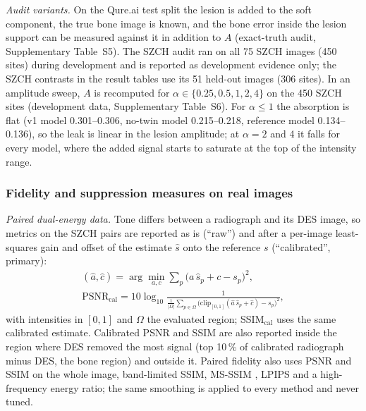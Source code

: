 \emph{Audit variants.} On the Qure.ai test split the lesion is added to the soft component, the true bone image is known, and the bone
error inside the lesion support can be measured against it in addition to $A$ (exact-truth audit, Supplementary Table~S5). The SZCH audit
ran on all 75 SZCH images (450 sites) during development and is reported as development evidence only; the SZCH contrasts in the result
tables use its 51 held-out images (306 sites). In an amplitude sweep, $A$ is recomputed for $\alpha\in\{0.25,0.5,1,2,4\}$ on the 450 SZCH
sites (development data, Supplementary Table~S6). For $\alpha\le1$ the absorption is flat (v1 model 0.301--0.306, no-twin model
0.215--0.218, reference model 0.134--0.136), so the leak is linear in the lesion amplitude; at $\alpha=2$ and 4 it falls for every model,
where the added signal starts to saturate at the top of the intensity range.

\subsubsection{Fidelity and suppression measures on real images}
\label{sec:m-fidelity}
\emph{Paired dual-energy data.} Tone differs between a radiograph and its DES image, so metrics on the SZCH pairs are reported as is
(``raw'') and after a per-image least-squares gain and offset of the estimate $\hat s$ onto the reference $s$ (``calibrated'', primary):
\begin{equation}
\begin{gathered}
(\hat a,\hat c)=\arg\min_{a,c}\sum_p\big(a\,\hat s_p+c-s_p\big)^2,\\
\mathrm{PSNR}_{\mathrm{cal}}=10\log_{10}\frac{1}{\frac{1}{|\Omega|}\sum_{p\in\Omega}\big(\mathrm{clip}_{[0,1]}(\hat a\,\hat s_p+\hat c)-s_p\big)^2},
\end{gathered}
\label{eq:psnrcal}
\end{equation}
with intensities in $[0,1]$ and $\Omega$ the evaluated region; SSIM$_{\mathrm{cal}}$ uses the same calibrated estimate. Calibrated PSNR and
SSIM are also reported inside the region where DES removed the most signal (top 10\,\% of calibrated radiograph minus DES, the bone region)
and outside it. Paired fidelity also uses PSNR and SSIM \cite{wang2004ssim} on the whole image, band-limited SSIM, MS-SSIM
\cite{wang2003msssim}, LPIPS \cite{zhang2018lpips} and a high-frequency energy ratio; the same smoothing is applied to every method and never
tuned.


